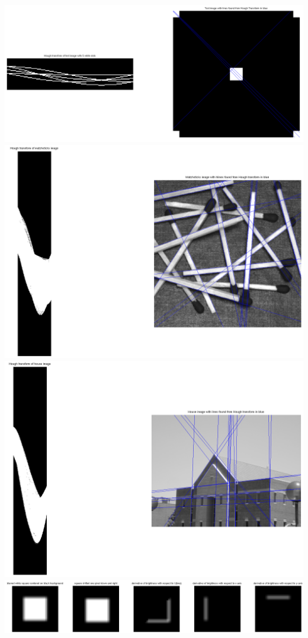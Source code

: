 \documentclass{article}
\begin{document}
\newpage
\includegraphics[width=7.5in]{1b.png}
\includegraphics[width=7.5in]{1c.png}
\includegraphics[width=7.5in]{1d.png}
\newpage
\includegraphics[width=7.5in]{2b.png}
\end{document}
